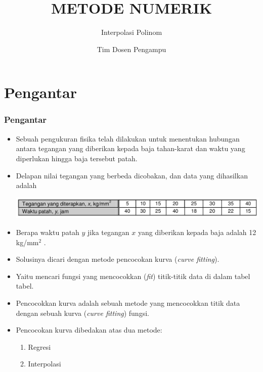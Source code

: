\documentclass[pdflatex,compress,mathserif]{beamer}
\title{METODE NUMERIK}
\subtitle{Interpolasi Polinom}
\author{Tim Dosen Pengampu}
\begin{document}
\maketitle

\section{Pengantar}

\begin{frame}
	\frametitle{Pengantar}
	\begin{itemize}
		\item Sebuah pengukuran fisika telah dilakukan untuk menentukan hubungan antara tegangan yang diberikan kepada baja tahan-karat dan waktu yang diperlukan hingga baja tersebut patah.
		\item Delapan nilai tegangan yang berbeda dicobakan, dan data yang dihasilkan adalah
		\begin{center}
			\includegraphics[width=\linewidth]{img/img01}
		\end{center}
		\item Berapa waktu patah $ y $ jika tegangan $ x $ yang diberikan kepada baja adalah 12 kg/mm$ ^2 $ .
	\end{itemize}
\end{frame}

\begin{frame}
	\begin{itemize}
		\item Solusinya dicari dengan metode pencocokan kurva (\textit{curve fitting}).
		\item Yaitu mencari fungsi yang mencocokkan (\textit{fit}) titik-titik data di dalam tabel tabel.
		\item Pencocokkan kurva adalah sebuah metode yang mencocokkan titik data dengan sebuah kurva (\textit{curve fitting}) fungsi.
		\item Pencocokan kurva dibedakan atas dua metode:
		\begin{enumerate}
			\item Regresi
			\item Interpolasi
		\end{enumerate}
	\end{itemize}
\end{frame}
\end{document}
